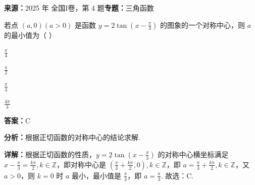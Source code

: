 \begin{question}[points=5]
\textbf{来源：}2025 年 全国I卷，第 4 题\quad \textbf{专题：}三角函数\par
若点 $(a,0)(a>0)$ 是函数 $y = 2\tan\left(x - \frac{\pi}{3}\right)$ 的图象的一个对称中心，则 $a$ 的最小值为（ ）
\begin{choices}
  \item $\frac{\pi}{4}$
  \item $\frac{\pi}{2}$
  \item $\frac{\pi}{3}$
  \item $\frac{4\pi}{3}$
\end{choices}
\begin{solution}
\textbf{答案：}C

\textbf{分析：}根据正切函数的对称中心的结论求解.

\textbf{详解：}根据正切函数的性质，$y = 2\tan\left(x - \frac{\pi}{3}\right)$ 的对称中心横坐标满足 $x - \frac{\pi}{3} = \frac{k\pi}{2}, k \in \mathbb{Z}$，即对称中心是 $\left(\frac{\pi}{3} + \frac{k\pi}{2}, 0\right), k \in \mathbb{Z}$，即 $a = \frac{\pi}{3} + \frac{k\pi}{2}, k \in \mathbb{Z}$，又 $a>0$，则 $k=0$ 时 $a$ 最小，最小值是 $\frac{\pi}{3}$，即 $a = \frac{\pi}{3}$. 故选：C.
\end{solution}
\end{question}

